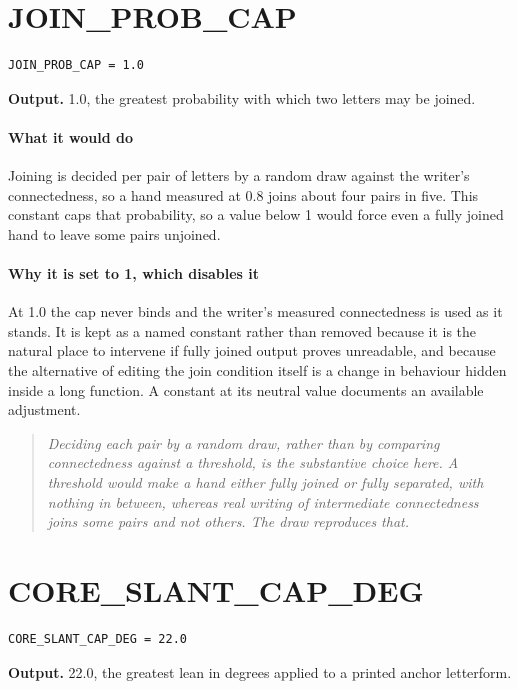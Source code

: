 \section{JOIN\_PROB\_CAP}
\begin{lstlisting}[style=sig]
JOIN_PROB_CAP = 1.0
\end{lstlisting}

\noindent\textbf{Output.} 1.0, the greatest probability with which two letters may be joined.


\paragraph{What it would do}
Joining is decided per pair of letters by a random draw against the writer's connectedness, so a hand measured at 0.8 joins about four pairs in five. This constant caps that probability, so a value below 1 would force even a fully joined hand to leave some pairs unjoined.


\paragraph{Why it is set to 1, which disables it}
At 1.0 the cap never binds and the writer's measured connectedness is used as it stands. It is kept as a named constant rather than removed because it is the natural place to intervene if fully joined output proves unreadable, and because the alternative of editing the join condition itself is a change in behaviour hidden inside a long function. A constant at its neutral value documents an available adjustment.


\begin{quote}\small\itshape Deciding each pair by a random draw, rather than by comparing connectedness against a threshold, is the substantive choice here. A threshold would make a hand either fully joined or fully separated, with nothing in between, whereas real writing of intermediate connectedness joins some pairs and not others. The draw reproduces that.\end{quote}

\section{CORE\_SLANT\_CAP\_DEG}
\begin{lstlisting}[style=sig]
CORE_SLANT_CAP_DEG = 22.0
\end{lstlisting}

\noindent\textbf{Output.} 22.0, the greatest lean in degrees applied to a printed anchor letterform.


